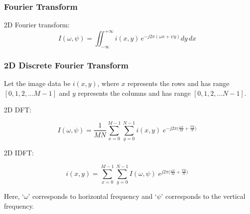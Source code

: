 \documentclass[compress]{beamer}
\begin{document}
  \begin{frame}
    \frametitle{Fourier Transform}

    \vskip -10pt

    \begin{figure}[H]
      \centering
    \end{figure}

    \vskip -10pt

    \begin{block}{2D Fourier transform:} 
    \begin{equation*}
      I(\omega,\psi) = \iint_{-\infty}^{+\infty} i(x,y) \,
      e^{-j2\pi(\omega x + \psi y)} dy\,dx
      \label{1D_fourier_transform}
    \end{equation*}
    \end{block}

  \end{frame}

  \begin{frame}
    \frametitle{2D Discrete Fourier Transform}

      Let the image data be $i(x, y)$, where $x$ represents the rows and has
      range $[0, 1, 2, \ldots M-1]$ and $y$ represents the columns and has
      range $[0, 1, 2, \ldots N-1]$. 

    \begin{block}{2D DFT:}
      
      \begin{equation}
        I(\omega, \psi) = \frac{1}{MN} \sum_{x=0}^{M-1} \sum_{y=0}^{N-1} i(x,y) \;
        e^{-j2\pi \big( \frac{\omega x}{M} + \frac{\psi y}{N} \big)}
      \end{equation}

    \end{block}

    \begin{block}
      {2D IDFT:}

    \begin{equation}
      i(x,y) = \sum_{x=0}^{M-1} \sum_{y=0}^{N-1} I(\omega, \psi) \;
      e^{j2\pi \big( \frac{\omega x}{M} + \frac{\psi y}{N} \big)}
    \end{equation}
    
    \end{block}

    \vskip 5pt

    Here, `$\omega$' corresponds to horizontal frequency and `$\psi$'
    corresponds to the vertical frequency.

  \end{frame}
\end{document}
